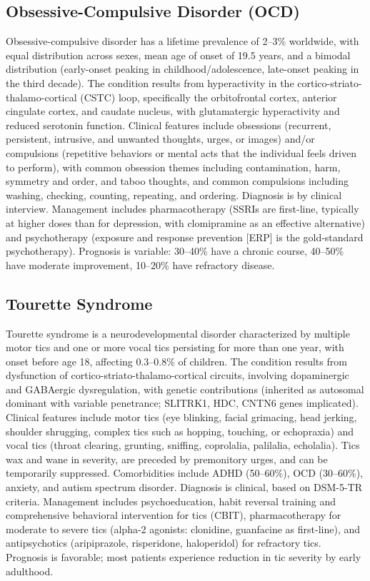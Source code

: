 \subsection{Obsessive-Compulsive Disorder (OCD)}
\label{sec:Obsessive-Compulsive Disorder (OCD)}
Obsessive-compulsive disorder has a lifetime prevalence of 2--3\% worldwide, with equal distribution across sexes, mean age of onset of 19.5 years, and a bimodal distribution (early-onset peaking in childhood/adolescence, late-onset peaking in the third decade). The condition results from hyperactivity in the cortico-striato-thalamo-cortical (CSTC) loop, specifically the orbitofrontal cortex, anterior cingulate cortex, and caudate nucleus, with glutamatergic hyperactivity and reduced serotonin function. Clinical features include obsessions (recurrent, persistent, intrusive, and unwanted thoughts, urges, or images) and/or compulsions (repetitive behaviors or mental acts that the individual feels driven to perform), with common obsession themes including contamination, harm, symmetry and order, and taboo thoughts, and common compulsions including washing, checking, counting, repeating, and ordering. Diagnosis is by clinical interview. Management includes pharmacotherapy (SSRIs are first-line, typically at higher doses than for depression, with clomipramine as an effective alternative) and psychotherapy (exposure and response prevention [ERP] is the gold-standard psychotherapy). Prognosis is variable: 30--40\% have a chronic course, 40--50\% have moderate improvement, 10--20\% have refractory disease.

\subsection{Tourette Syndrome}
\label{sec:Tourette Syndrome}
Tourette syndrome is a neurodevelopmental disorder characterized by multiple motor tics and one or more vocal tics persisting for more than one year, with onset before age 18, affecting 0.3--0.8\% of children. The condition results from dysfunction of cortico-striato-thalamo-cortical circuits, involving dopaminergic and GABAergic dysregulation, with genetic contributions (inherited as autosomal dominant with variable penetrance; SLITRK1, HDC, CNTN6 genes implicated). Clinical features include motor tics (eye blinking, facial grimacing, head jerking, shoulder shrugging, complex tics such as hopping, touching, or echopraxia) and vocal tics (throat clearing, grunting, sniffing, coprolalia, palilalia, echolalia). Tics wax and wane in severity, are preceded by premonitory urges, and can be temporarily suppressed. Comorbidities include ADHD (50--60\%), OCD (30--60\%), anxiety, and autism spectrum disorder. Diagnosis is clinical, based on DSM-5-TR criteria. Management includes psychoeducation, habit reversal training and comprehensive behavioral intervention for tics (CBIT), pharmacotherapy for moderate to severe tics (alpha-2 agonists: clonidine, guanfacine as first-line), and antipsychotics (aripiprazole, risperidone, haloperidol) for refractory tics. Prognosis is favorable; most patients experience reduction in tic severity by early adulthood.

